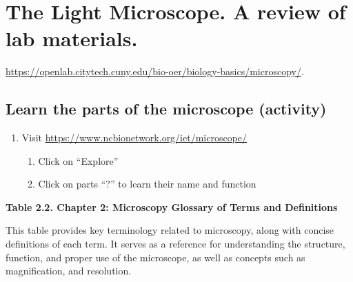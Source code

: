 \documentclass[
  letterpaper,
  DIV=11,
  numbers=noendperiod]{scrreprt}
\begin{document}
\section{\texorpdfstring{\textbf{The Light Microscope. A review of lab
materials.}}{The Light Microscope. A review of lab materials.}}\label{the-light-microscope.-a-review-of-lab-materials.}

\url{https://openlab.citytech.cuny.edu/bio-oer/biology-basics/microscopy/}.

\subsection{Learn the parts of the microscope
(activity)}\label{learn-the-parts-of-the-microscope-activity}

\begin{enumerate}
\def\labelenumi{\alph{enumi}.}
\item
  Visit \url{https://www.ncbionetwork.org/iet/microscope/}

  \begin{enumerate}
  \def\labelenumii{\roman{enumii}.}
  \item
    Click on ``Explore''
  \item
    Click on parts ``?'' to learn their name and function
  \end{enumerate}
\end{enumerate}

\textbf{Table 2.2. Chapter 2: Microscopy Glossary of Terms and
Definitions}

This table provides key terminology related to microscopy, along with
concise definitions of each term. It serves as a reference for
understanding the structure, function, and proper use of the microscope,
as well as concepts such as magnification, and resolution.
\end{document}
